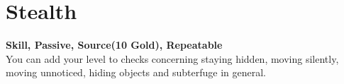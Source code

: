 \section{Stealth}\label{sec:stealth}
\textbf{Skill, Passive, Source(10 Gold), Repeatable}\\
You can add your level to checks concerning staying hidden, moving silently, moving unnoticed, hiding objects and subterfuge in general.